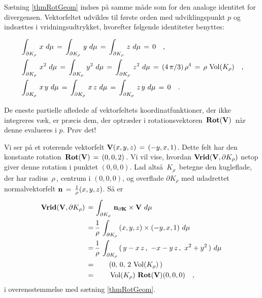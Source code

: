 \begin{think}
Sætning \ref{thmRotGeom} indses på samme måde som for den
analoge identitet for divergensen.
Vektorfeltet udvikles til første orden med
udviklingspunkt $p$ og indsættes i
vridningsudtrykket, hvorefter følgende identiteter benyttes:

\begin{equation} \label{eqKugleintegraler}
\begin{aligned}
&\int_{\partial K_{\rho}}\,x \,\,d\mu \, = \,
\int_{\partial K_{\rho}}\,y \,\,d\mu \, = \,
\int_{\partial K_{\rho}}\,z \,\,d\mu \, = \,0 \quad , \\
&\int_{\partial K_{\rho}}\,x^{2}\,\, d\mu \, = \,
\int_{\partial K_{\rho}}\,y^{2}\,\, d\mu \, = \,
\int_{\partial K_{\rho}}\,z^{2}\,\, d\mu \, = \, (4\,\pi/3)\,\rho^{4}\, = \, \rho\,\operatorname{Vol}(K_{\rho})\quad , \\
& \int_{\partial K_{\rho}}\,x\,y \,\,d\mu \, = \,
\int_{\partial K_{\rho}}\,x\,z \,\,d\mu \, =
\,\int_{\partial K_{\rho}}\,z\,y \,\,d\mu \, =
\,0 \quad .
\end{aligned}
\end{equation}

De eneste
partielle afledede af vektorfeltets
koordinatfunktioner, der ikke integreres væk, er
præcis dem, der optræder i rotationsvektoren
$\,\operatorname{\mathbf{Rot}}({\bf{V}})\,$ når denne evalueres i $p$.
Prøv det!
\end{think}

\begin{example}
Vi ser på et roterende vektorfelt
${\bf{V}}(x,y,z)\, = \, (-y, x, 1)$. Dette felt har den konstante
rotation $\,\operatorname{\mathbf{Rot}}({\bf{V}})\, = \, (0, 0, 2)\,$. Vi vil vise, hvordan
$\operatorname{\bf{Vrid}}({\bf{V}},
\partial K_{\rho})$ netop giver denne rotation i
punktet $(0,0,0)$. Lad altså $\,K_{\rho}\,$
betegne den kugleflade, der har radius
$\,\rho\,$, centrum i $(0,0,0)$, og overflade
$\partial K_{\rho}$ med udadrettet
normalvektorfelt ${\bf{n}}\, = \,
\frac{1}{\rho}(x,y,z)$. Så er
$$
\begin{aligned}
\operatorname{\bf{Vrid}}({\bf{V}}, \partial K_{\rho}) \, = \,
&\int_{\partial K_{\rho}}\, {\bf{n}_{\partial K}}\times
{\bf{V}} \, \, d\mu \,
\\ = \,  &\frac{1}{\rho}\,\int_{\partial K_{\rho}}\, (x, y, z) \times (-y, x, 1 ) \, \, d\mu \, \\ = \,
&\frac{1}{\rho}\,\int_{\partial K_{\rho}}\, (\,y
- x\,z\, , \,\, -x - y\,z\, , \,\, x^{2} +
y^{2}\,) \, \, d\mu \, \\ = \, &\qquad (0, \,
0,\, 2\,\operatorname{Vol}(K_{\rho})\,) \, \\ = \, &\qquad
\operatorname{Vol}(K_{\rho})\,\operatorname{\mathbf{Rot}}({\bf{V}})(0,0,0) \quad ,
\end{aligned}
$$
i overensstemmelse med sætning \ref{thmRotGeom}.
\end{example}

